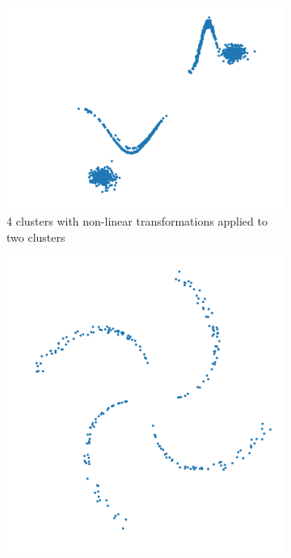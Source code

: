 \documentclass[10pt]{article}
\begin{document}
\begin{figure}[H]
    \begin{subfigure}{.38\textwidth}
        \centering
        \includegraphics[width=\textwidth]{D1_data}
        \caption{4 clusters with non-linear transformations applied to two clusters}
    \end{subfigure}
    \begin{subfigure}{.3\textwidth}
        \centering
        \includegraphics[width=\textwidth]{D2_data}

\end{subfigure}
\end{figure}
\end{document}
